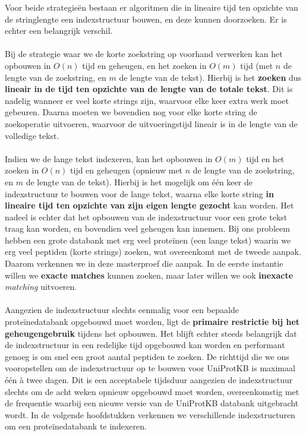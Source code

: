 Voor beide strategieën bestaan er algoritmen die in lineaire tijd ten opzichte van de stringlengte een indexstructuur bouwen, en deze kunnen doorzoeken.
Er is echter een belangrijk verschil.
\\ \\
Bij de strategie waar we de korte zoekstring op voorhand verwerken kan het opbouwen in $O(n)$ tijd en geheugen, en het zoeken in $O(m)$ tijd (met $n$ de lengte van de zoekstring, en $m$ de lengte van de tekst).
Hierbij is het \textbf{zoeken} dus \textbf{lineair in de tijd ten opzichte van de lengte van de totale tekst}.
Dit is nadelig wanneer er veel korte strings zijn, waarvoor elke keer extra werk moet gebeuren.
Daarna moeten we bovendien nog voor elke korte string de zoekoperatie uitvoeren, waarvoor de uitvoeringstijd lineair is in de lengte van de volledige tekst.
\\ \\
Indien we de lange tekst indexeren, kan het opbouwen in $O(m)$ tijd en het zoeken in $O(n)$ tijd en geheugen (opnieuw met $n$ de lengte van de zoekstring, en $m$ de lengte van de tekst).
Hierbij is het mogelijk om één keer de indexstructuur te bouwen voor de lange tekst, waarna elke korte string \textbf{in lineaire tijd ten opzichte van zijn eigen lengte gezocht} kan worden.
Het nadeel is echter dat het opbouwen van de indexstructuur voor een grote tekst traag kan worden, en bovendien veel geheugen kan innemen.
\newpage
Bij ons probleem hebben een grote databank met erg veel proteïnen (een lange tekst) waarin we erg veel peptiden (korte strings) zoeken, wat overeenkomt met de tweede aanpak.
Daarom verkennen we in deze masterproef die aanpak.
In de eerste instantie willen we \textbf{exacte matches} kunnen zoeken, maar later willen we ook \textbf{inexacte} \textit{matching} uitvoeren.
\\ \\
Aangezien de indexstructuur slechts eenmalig voor een bepaalde proteïnedatabank opgebouwd moet worden, ligt de \textbf{primaire restrictie bij het geheugengebruik} tijdens het opbouwen.
Het blijft echter steeds belangrijk dat de indexstructuur in een redelijke tijd opgebouwd kan worden en performant genoeg is om snel een groot aantal peptiden te zoeken.
De richttijd die we ons vooropstellen om de indexstructuur op te bouwen voor UniProtKB is maximaal één à twee dagen.
Dit is een acceptabele tijdsduur aangezien de indexstructuur slechts om de acht weken opnieuw opgebouwd moet worden, overeenkomstig met de frequentie waarbij een nieuwe versie van de UniProtKB databank uitgebracht wordt.
In de volgende hoofdstukken verkennen we verschillende indexstructuren om een proteïnedatabank te indexeren.